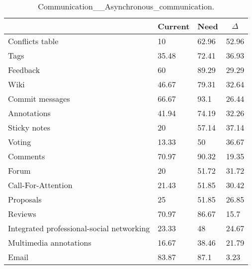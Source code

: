 
  \begin{table*}[]
  \centering
  \notsotiny
  \caption{ Communication__Asynchronous_communication.}
\label{tab:communication__asynchronous_communication}
\begin{tabular}{|l|l|l|l|}
  \hline
  \rowcolor[HTML]{C0C0C0}
    \multicolumn{1}{|c|}{Feature} & \multicolumn{1}{c|}{Current} & \multicolumn{1}{c|}{Need} & \multicolumn{1}{c|}{$\Delta$} \\ \hline
  Conflicts table & 10 & 62.96 & 52.96 \\ \hline 
Tags & 35.48 & 72.41 & 36.93 \\ \hline 
Feedback & 60 & 89.29 & 29.29 \\ \hline 
Wiki & 46.67 & 79.31 & 32.64 \\ \hline 
Commit messages & 66.67 & 93.1 & 26.44 \\ \hline 
Annotations & 41.94 & 74.19 & 32.26 \\ \hline 
Sticky notes & 20 & 57.14 & 37.14 \\ \hline 
Voting & 13.33 & 50 & 36.67 \\ \hline 
Comments & 70.97 & 90.32 & 19.35 \\ \hline 
Forum & 20 & 51.72 & 31.72 \\ \hline 
Call-For-Attention & 21.43 & 51.85 & 30.42 \\ \hline 
Proposals & 25 & 51.85 & 26.85 \\ \hline 
Reviews & 70.97 & 86.67 & 15.7 \\ \hline 
Integrated professional-social networking & 23.33 & 48 & 24.67 \\ \hline 
Multimedia annotations & 16.67 & 38.46 & 21.79 \\ \hline 
Email & 83.87 & 87.1 & 3.23 \\ \hline 
\end{tabular}%
  \end{table*}